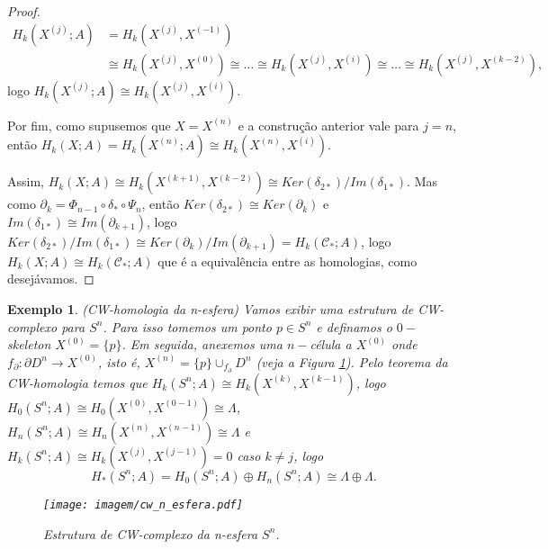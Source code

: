 \documentclass[12pt]{book}
\newtheorem{exemplo}[teorema]{Exemplo}
\newcommand{\celula}[2]{D^{#1}_{#2}}
\newcommand{\celulabordo}[2]{\partial D^{#1}_{#2}}
\newcommand{\homologia}[2]{H_{#1}(#2;A)}
\newcommand{\homologiarel}[3]{H_{#1}(#2,#3)}
\newcommand{\homologiarelskele}[3]{H_{#1}(X^{(#2)}, X^{(#3)})}
\newcommand{\homologiarelskelesimpl}[2]{H_{#1}(X^{(#2)}, X^{(#2-1)})}
\newcommand{\skeleton}[1]{X^{(#1)}}
\begin{document}
\begin{proof}
		$$
		\begin{aligned}
		\homologia{k}{\skeleton{j}} &= \homologiarel{k}{\skeleton{j}}{\skeleton{-1}} 
		\\
		&\cong  \homologiarel{k}{\skeleton{j}}{\skeleton{0}} \cong \dots \cong  \homologiarel{k}{\skeleton{j}}{\skeleton{i}} \cong  \dots \cong \homologiarel{k}{\skeleton{j}}{\skeleton{k-2}},
		\end{aligned}
		$$
		logo $\homologia{k}{\skeleton{j}} \cong \homologiarel{k}{\skeleton{j}}{\skeleton{i}}$.
		
		Por fim, como supusemos que $X = \skeleton{n}$ e a construção anterior vale para $j = n$, então $\homologia{k}{X} = \homologia{k}{\skeleton{n}} \cong \homologiarelskele{k}{n}{i}$.
		
		Assim, $\homologia{k}{X} \cong \homologiarel{k}{\skeleton{k+1}}{\skeleton{k-2}} \cong Ker(\delta_{2*})/Im(\delta_{1*})$. Mas como $\partial_{k} = \Phi_{n-1}\circ\delta_{*}\circ\Psi_{n}$, então $Ker(\delta_{2*}) \cong Ker(\partial_{k})$ e $Im(\delta_{1*}) \cong Im(\partial_{k+1})$, logo $Ker(\delta_{2*})/Im(\delta_{1*}) \cong Ker(\partial_{k})/Im(\partial_{k+1}) = \homologia{k}{\mathcal{C}_{*}}$, logo $\homologia{k}{X} \cong \homologia{k}{\mathcal{C}_{*}}$ que é a equivalência entre as homologias, como desejávamos.
	\end{proof}
	
	\begin{exemplo}
		(CW-homologia da n-esfera)
		Vamos exibir uma estrutura de CW-complexo para $S^{n}$. Para isso tomemos um ponto $p \in S^{n}$ e definamos o $0-$skeleton $\skeleton{0}=\{p\}$. Em seguida, anexemos uma $n-$célula a $\skeleton{0}$ onde $f_{\partial}: \celulabordo{n}{} \to \skeleton{0}$, isto é, $\skeleton{n} = \{p\}\cup_{f_{\partial}} \celula{n}{}$ (veja a Figura \ref{figura_cw_n_esfera}). Pelo teorema da CW-homologia temos que $\homologia{k}{S^{n}} \cong \homologiarelskelesimpl{k}{k}$, logo $\homologia{0}{S^{n}} \cong \homologiarelskelesimpl{0}{0} \cong \Lambda$, $\homologia{n}{S^{n}} \cong \homologiarelskelesimpl{n}{n} \cong \Lambda$ e $\homologia{k}{S^{n}} \cong \homologiarelskelesimpl{k}{j} =0$ caso $k \neq j$, logo
		$$
		\homologia{*}{S^{n}} = \homologia{0}{S^{n}}\oplus\homologia{n}{S^{n}} \cong \Lambda\oplus\Lambda.
		$$
		\begin{figure}[!h]
			\centering
			\texttt{[image: imagem/cw\_n\_esfera.pdf]}
			\caption{Estrutura de CW-complexo da n-esfera $S^{n}$.}
			\label{figura_cw_n_esfera}
		\end{figure} 
	\end{exemplo}
	
\end{document}
